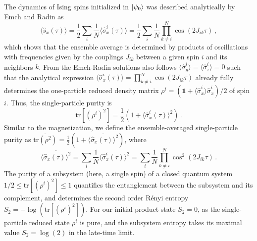 \documentclass[aps,twocolumn,
superscriptaddress,
footinbib,
prl]{revtex4-1}
\begin{document}
The dynamics of Ising spins initialized in $\ket{\psi_0}$ was described analytically by Emch \cite{Emch1966Non-markovianEquilibrium} and Radin \cite{Radin1970ApproachModel} as
\begin{equation}
\label{EmchRadin}
    \overline{\langle \hat{s}_x(\tau) \rangle} = \frac{1}{2} \sum_i \frac{1}{N}\langle \hat{\sigma}^i_x(\tau)\rangle  =\frac{1}{2} \sum_i \frac{1}{N}  \prod_{k \neq i}^N \cos(2 J_{ik} \tau) \,,
\end{equation}
which shows that the ensemble average is determined by products of oscillations with frequencies given by the couplings $J_{ik}$ between a given spin $i$ and its neighbors $k$. From the Emch-Radin solutions also follows $\langle \hat{\sigma}_y^i \rangle = \langle \hat{\sigma}_z^i \rangle = 0$ such that the analytical expression  $\langle \hat{\sigma}^i_x(\tau)\rangle  = \prod_{k \neq i}^N \cos(2 J_{ik} \tau)$ already fully determines the one-particle reduced density matrix $\rho^i= \left( \mathbb{1} + \langle \hat{\sigma}_x^i \rangle \hat{\sigma}_x^i \right)/2$ of spin $i$.
Thus, the single-particle purity is 
\begin{equation}
    \mathrm{tr}[(\rho^i)^2] = \frac{1}{2}\left(1 + \langle \hat{\sigma}_x^i(\tau) \rangle^2 \right) \,.
\end{equation}
Similar to the magnetization, we define the ensemble-averaged single-particle purity as
$\overline{\mathrm{tr}(\rho^{2})} = \frac{1}{2}\left(1 + \overline{\langle \hat{\sigma}_x(\tau) \rangle^2} \right)$, where 
\begin{equation}
\label{purity}
    \overline{\langle \hat{\sigma}_x(\tau) \rangle^2} = \sum_i \frac{1}{N}\langle \hat{\sigma}_x^i(\tau) \rangle^2  = \sum_i \frac{1}{N}\prod_{k \neq i}^N \cos^2(2 J_{ik} \tau) \,.
\end{equation}
The purity of a subsystem (here, a single spin) of a closed quantum system $1/2 \leq  \mathrm{tr}[(\rho^i)^2] \leq 1 $ quantifies the entanglement between the subsystem and its complement, and determines the second order Rényi entropy $S_2=-\log( \mathrm{tr}[(\rho^i)^2])$. For our initial product state $S_2=0$, as the single-particle reduced state $\rho^i$ is pure, and the subsystem entropy takes its maximal value $S_2=\log(2)$ in the late-time limit.
\end{document}
